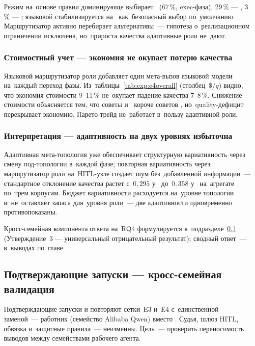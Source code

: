 Режим на~основе правил доминирующе выбирает~ (67\,\%, exec-фаза),
29\,\% --- , 3\,\% --- ; языковой
стабилизируется на~ как~безопасный выбор по~умолчанию. Маршрутизатор
активно перебирает альтернативы~--- гипотеза о~реализационном
ограничении исключена, но~прироста качества адаптивные роли не~дают.

\subsubsection*{Стоимостный учет --- экономия не окупает потерю качества}

Языковой маршрутизатор роли добавляет один мета-вызов языковой модели на~каждый
переход фазы. Из~таблицы~\ref{tab:exp:e4overall} (столбец~\$/$q$) видно,
что экономия стоимости 9--11\,\% не~окупает падение качества 7--8\,\%.
Снижение стоимости объясняется тем, что советы  и~
короче советов , но~quality-дефицит перекрывает экономию.
Парето-трейд не~работает в~пользу адаптивной роли.

\subsubsection*{Интерпретация --- адаптивность на двух уровнях избыточна}

Адаптивная мета-топология уже обеспечивает структурную вариативность
через смену под-топологии в~каждой фазе; повторная вариативность через
маршрутизатор роли на~HITL-узле создает шум без~добавленной информации~---
стандартное отклонение качества растет с~$0{,}295$ у~
до~$0{,}358$ у~ на~агрегате по~трем корпусам. Бюджет вариативности
расходуется на~уровне топологии и~не~оставляет запаса для~уровня роли~---
две адаптивности одновременно противопоказаны.

Кросс-семейная компонента ответа на~RQ4 формулируется
в~подразделе~\ref{sec:exp:conf} (Утверждение~3 --- универсальный отрицательный результат);
сводный ответ~--- в~выводах по~главе.

\subsection{Подтверждающие запуски — кросс-семейная валидация}
\label{sec:exp:conf}

Подтверждающие запуски  и  повторяют
сетки~E3 и~E4 с~единственной заменой~--- работник
 (семейство Alibaba
Qwen) вместо . Судья, шлюз HITL, обвязка
и~защитные правила~--- неизменны. Цель~--- проверить переносимость
выводов между семействами рабочего агента.


